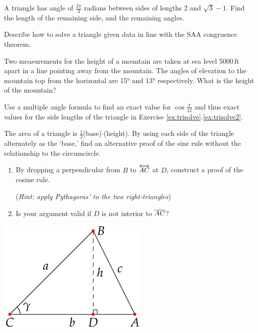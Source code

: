 \begin{exercises}{}{}
	\exstart A triangle has angle of $\frac{2\pi}3$ radians between sides of lengths 2 and $\sqrt 3-1$. Find the length of the remaining side, and the remaining angles.\vspace{-2pt}
	\begin{enumerate}\setcounter{enumi}{1}	
		\item Describe how to solve a triangle given data in line with the SAA congruence theorem.
		
		
		\item Two measurements for the height of a mountain are taken at sea level 5000\,ft apart in a line pointing away from the mountain. The angles of elevation to the mountain top from the horizontal are \ang{15} and \ang{13} respectively. What is the height of the mountain?
		
		
		\item Use a multiple angle formula to find an exact value for $\cos\frac{\pi}{12}$ and thus exact values for the side lengths of the triangle in Exercise \ref*{ex:trisolve}.\ref{ex:trisolve2}.
		
		
		\item The area of a triangle is $\frac 12$(base)$\cdot$(height). By using each side of the triangle alternately as the `base,' find an alternative proof of the sine rule without the relationship to the circumcircle. 
	
		\begin{minipage}[t]{0.72\linewidth}\vspace{-8pt}	
			\item\begin{enumerate}
			  \item By dropping a perpendicular from $B$ to $\overleftrightarrow{AC}$ at $D$, construct a proof of the cosine rule.\par
		 		(\emph{Hint: apply Pythagoras' to the two right-triangles})
		 		
		 		\item Is your argument valid if $D$ is not interior to $\overline{AC}$?
			\end{enumerate}
		\end{minipage}
		\hfill
		\begin{minipage}[t]{0.27\linewidth}\vspace{-12pt}
			\flushright\includegraphics[scale=0.9]{angles-cosrule}
		\end{minipage}
	

\end{enumerate}
\end{exercises}
